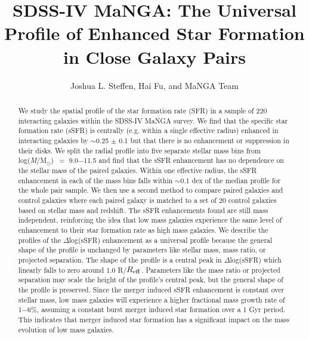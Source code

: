\documentclass[iop,revtex4,twocolumn,apj,numberedappendix,appendixfloats]{emulateapj}
\newcommand{\reff}{$R_{\rm eff}$}
\newcommand{\logm}{log({\it M}/M$_{\odot}$)}
\begin{document}
\title{
SDSS-IV MaNGA: The Universal Profile of Enhanced Star Formation in Close Galaxy Pairs
}

\author{
Joshua L. Steffen, 
Hai Fu, and 
MaNGA Team 
}

\begin{abstract}
We study the spatial profile of the star formation rate (SFR) in a sample of 220 interacting galaxies within the SDSS-IV MaNGA survey. We find that the specific star formation rate (sSFR) is centrally (e.g. within a single effective radius) enhanced in interacting galaxies by $\sim$0.25 $\pm$ 0.1 but that there is no enhancement or suppression in their disks. We split the radial profile into five separate stellar mass bins from \logm\ $=$ 9.0$-$11.5 and find that the sSFR enhancement has no dependence on the stellar mass of the paired galaxies. Within one effective radius, the sSFR enhancement in each of the mass bins falls within $\sim$0.1 dex of the median profile for the whole pair sample. We then use a second method to compare paired galaxies and control galaxies where each paired galaxy is matched to a set of 20 control galaxies based on stellar mass and redshift. The sSFR enhancements found are still mass independent, reinforcing the idea that low mass galaxies experience the same level of enhancement to their star formation rate as high mass galaxies. We describe the profiles of the $\Delta$log(sSFR) enhancement as a universal profile because the general shape of the profile is unchanged by parameters like stellar mass, mass ratio, or projected separation. The shape of the profile is a central peak in $\Delta$log(sSFR) which linearly falls to zero around 1.0 R/\reff. Parameters like the mass ratio or projected separation may scale the height of the profile's central peak, but the general shape of the profile is preserved. Since the merger induced sSFR enhancement is constant over stellar mass, low mass galaxies will experience a higher fractional mass growth rate of 1$-$6\%, assuming a constant burst merger induced star formation over a 1 Gyr period. This indicates that merger induced star formation has a significant impact on the mass evolution of low mass galaxies. 

\end{abstract}

\end{document}
